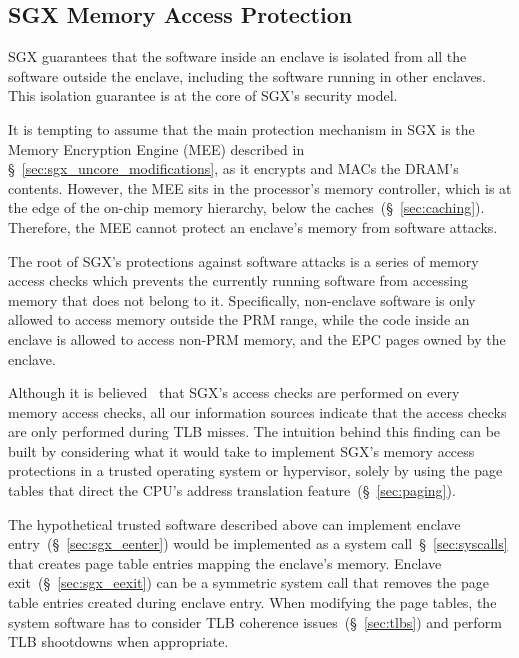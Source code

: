 \subsection{SGX Memory Access Protection}
\label{sec:sgx_access_protection}

SGX guarantees that the software inside an enclave is isolated from all the
software outside the enclave, including the software running in other enclaves.
This isolation guarantee is at the core of SGX's security model.

It is tempting to assume that the main protection mechanism in SGX is the
Memory Encryption Engine (MEE) described in
\S~\ref{sec:sgx_uncore_modifications}, as it encrypts and MACs the DRAM's
contents. However, the MEE sits in the processor's memory controller, which is
at the edge of the on-chip memory hierarchy, below the
caches~(\S~\ref{sec:caching}). Therefore, the MEE cannot protect an enclave's
memory from software attacks.


The root of SGX's protections against software attacks is a series of memory
access checks which prevents the currently running software from accessing
memory that does not belong to it. Specifically, non-enclave software is only
allowed to access memory outside the PRM range, while the code inside an
enclave is allowed to access non-PRM memory, and the EPC pages owned by the
enclave.

Although it is believed~\cite{evtyushkin2014isox} that SGX's access checks are
performed on every memory access checks, all our information sources indicate
that the access checks are only performed during TLB misses. The intuition
behind this finding can be built by considering what it would take to implement
SGX's memory access protections in a trusted operating system or hypervisor,
solely by using the page tables that direct the CPU's address
translation feature~(\S~\ref{sec:paging}).

The hypothetical trusted software described above can implement enclave
entry~(\S~\ref{sec:sgx_eenter}) would be implemented as a system
call~\S~\ref{sec:syscalls} that creates page table entries mapping the
enclave's memory. Enclave exit~(\S~\ref{sec:sgx_eexit}) can be a symmetric
system call that removes the page table entries created during enclave entry.
When modifying the page tables, the system software has to consider TLB
coherence issues~(\S~\ref{sec:tlbs}) and perform TLB shootdowns when
appropriate.

